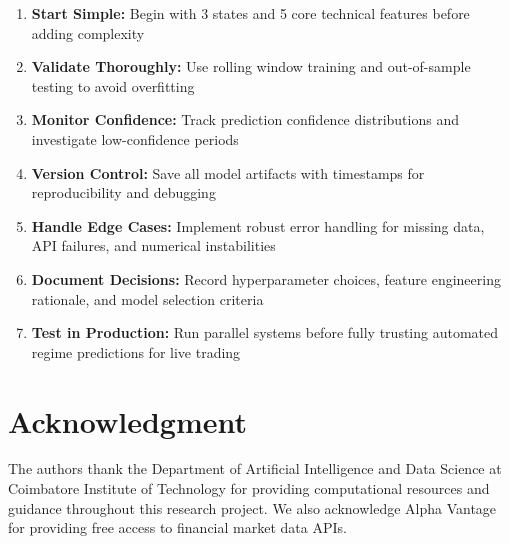 \documentclass[conference]{IEEEtran}
\begin{document}
\begin{enumerate}
\item \textbf{Start Simple:} Begin with 3 states and 5 core technical features before adding complexity
\item \textbf{Validate Thoroughly:} Use rolling window training and out-of-sample testing to avoid overfitting
\item \textbf{Monitor Confidence:} Track prediction confidence distributions and investigate low-confidence periods
\item \textbf{Version Control:} Save all model artifacts with timestamps for reproducibility and debugging
\item \textbf{Handle Edge Cases:} Implement robust error handling for missing data, API failures, and numerical instabilities
\item \textbf{Document Decisions:} Record hyperparameter choices, feature engineering rationale, and model selection criteria
\item \textbf{Test in Production:} Run parallel systems before fully trusting automated regime predictions for live trading
\end{enumerate}

\section*{Acknowledgment}
The authors thank the Department of Artificial Intelligence and Data Science at Coimbatore Institute of Technology for providing computational resources and guidance throughout this research project. We also acknowledge Alpha Vantage for providing free access to financial market data APIs.
\end{document}
